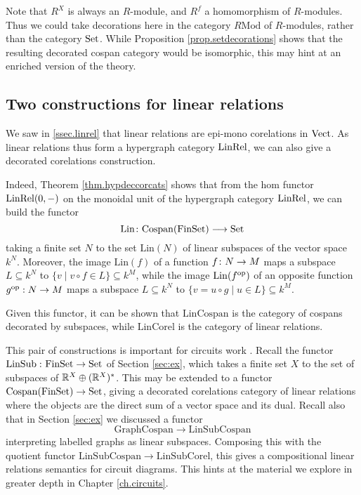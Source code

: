 Note that $R^X$ is always an $R$-module, and $R^f$ a homomorphism of
$R$-modules. Thus we could take decorations here in the category $R\mathrm{Mod}$
of $R$-modules, rather than the category $\mathrm{Set}$. While Proposition
\ref{prop.setdecorations} shows that the resulting decorated cospan category
would be isomorphic, this may hint at an enriched version of the theory.

\subsection{Two constructions for linear relations}

We saw in \textsection\ref{ssec.linrel} that linear relations are epi-mono
corelations in $\mathrm{Vect}$. As linear relations thus form a hypergraph category
$\mathrm{LinRel}$, we can also give a decorated corelations construction. 

Indeed, Theorem \ref{thm.hypdeccorcats} shows that from the hom functor
$\mathrm{LinRel}(0,-)$ on the monoidal unit of the hypergraph category $\mathrm{LinRel}$, we can
build the functor
\[
  \mathrm{Lin} {\colon}\mathrm{Cospan}(\mathrm{FinSet}) \longrightarrow \mathrm{Set}
\]
taking a finite set $N$ to the set $\mathrm{Lin}(N)$ of linear subspaces of the
vector space $k^N$. Moreover, the image $\mathrm{Lin}(f)$ of a function $f{\colon}
N \to M$ maps a subspace $L \subseteq k^N$ to $\{v \mid v\circ f \in L\}
\subseteq k^M$, while the image $\mathrm{Lin}(f^{\mathrm{op}})$ of an opposite function
$g^{\mathrm{op}}: N \to M$ maps a subspace $L \subseteq k^N$ to $\{v = u \circ g \mid u
\in L\} \subseteq k^M$. 

Given this functor, it can be shown that $\mathrm{LinCospan}$ is the category of
cospans decorated by subspaces, while $\mathrm{LinCorel}$ is the category of
linear relations. 

This pair of constructions is important for circuits work \cite{BF,BSZ}. Recall
the functor $\operatorname{LinSub}{\colon} \mathrm{FinSet} \to \mathrm{Set}$ of Section \ref{sec:ex}, which takes
a finite set $X$ to the set of subspaces of ${\mathbb{R}}^X \oplus ({\mathbb{R}}^X)^*$.  This may be
extended to a functor $\operatorname{{Cospan}}(\mathrm{FinSet}) \to \mathrm{Set}$, giving a decorated
corelations category of linear relations where the objects are the direct sum of
a vector space and its dual. Recall also that in Section \ref{sec:ex} we
discussed a functor 
\[
  \mathrm{GraphCospan} \to \mathrm{LinSubCospan}
\]
interpreting labelled graphs as linear subspaces. Composing this with the
quotient functor $\mathrm{LinSubCospan} \to \mathrm{LinSubCorel}$, this gives a
compositional linear relations semantics for circuit diagrams. This hints at the
material we explore in greater depth in Chapter \ref{ch.circuits}.


